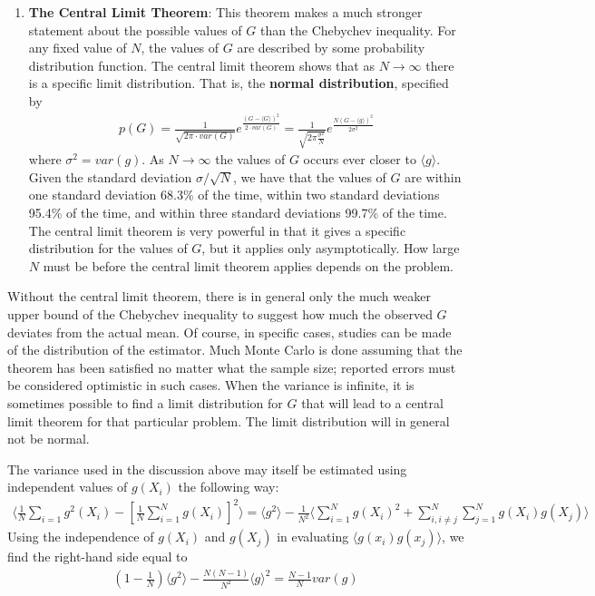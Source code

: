 \documentclass[twoside,english]{uiofysmaster}
\begin{document}
\begin{enumerate}
\item \textbf{The Central Limit Theorem}:
This theorem makes a much stronger statement about the possible values of $G$ than the Chebychev inequality. For any fixed value of $N$, the values of $G$ are described by some probability distribution function. The central limit theorem shows that as $N\rightarrow \infty$ there is a specific limit distribution. That is, the \textbf{normal distribution}, specified by
\begin{align}
	p(G) = \frac{1}{\sqrt{2\pi \cdot var(G)}} e^\frac{( G - \langle G \rangle )^2 }{2 \cdot var(G)}
	= \frac{1}{\sqrt{2\pi \frac{\sigma^2}{N} }} e^{\frac{N(G - \langle g\rangle)^2}{2\sigma^2}}
\end{align}
where $\sigma^2 = var(g)$. 
As $N\rightarrow \infty$ the values of $G$ occurs ever closer to $\langle g \rangle$. Given the standard deviation $\sigma/\sqrt{N}$, we have that the values of $G$ are within one standard deviation 68.3\% of the time, within two standard deviations 95.4\% of the time, and within three standard deviations 99.7\% of the time.
The central limit theorem is very powerful in that it gives a specific distribution for the values of $G$, but it applies only asymptotically. How large $N$ must be before the central limit theorem applies depends on the problem.

\end{enumerate}


Without the central limit theorem, there is in general only the much weaker upper bound of the Chebychev inequality to suggest how much the observed $G$ deviates from the actual mean. Of course, in specific cases, studies can be made of the distribution of the estimator. Much Monte Carlo is done assuming that the theorem has been satisfied no matter what the sample size; reported errors must be considered optimistic in such cases.
When the variance is infinite, it is sometimes possible to find a limit distribution for $G$ that will lead to a central limit theorem for that particular problem. The limit distribution will in general not be normal.

The variance used in the discussion above may itself be estimated using independent values of $g(X_i)$ the following way:
\begin{align}
	\langle \frac{1}{N} \sum_{i=1} g^2 (X_i) - [\frac{1}{N}\sum_{i=1}^N g(X_i)]^2 \rangle
	= \langle g^2 \rangle - \frac{1}{N^2} \langle
	\sum_{i=1}^N g(X_i)^2 + \sum_{i,i\neq j}^N \sum_{j=1}^N g(X_i) g(X_j) \rangle
\end{align}
Using the independence of $g(X_i)$ and $g(X_j)$ in evaluating $\langle g(x_i) g(x_j)\rangle $, we find the right-hand side equal to 
\begin{align}
	(1- \frac{1}{N}) \langle g^2 \rangle - \frac{N(N-1)}{N^2} \langle g \rangle^2
	= \frac{N-1}{N} var(g)
\end{align}
\end{document}
